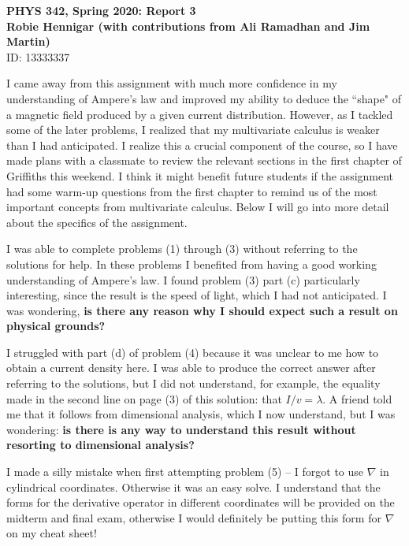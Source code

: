 \documentclass[11pt,usenames,dvipsnames]{article}
\begin{document}

\begin{center}
  \large\textbf{PHYS 342, Spring 2020: Report 3} \\ \vspace{10 pt}
  \textbf{Robie Hennigar (with contributions from Ali Ramadhan and Jim Martin)} \\
  \normalsize ID: 13333337 \\
\end{center}


I came away from this assignment with much more confidence in my understanding of Ampere's law and improved my ability to deduce the ``shape" of a magnetic field produced by a given current distribution.  However, as I tackled some of the later problems, I realized that my multivariate calculus is weaker than I had anticipated.  I realize this a crucial component of the course, so I have made plans with a classmate to review the relevant sections in the first chapter of Griffiths this weekend. I think it might benefit future students if the assignment had some warm-up questions from the first chapter to remind us of the most important concepts from multivariate calculus. Below I will go into more detail about the specifics of the assignment.

I was able to complete problems (1) through (3) without referring to the solutions for help. In these problems I benefited from having a good working understanding of Ampere's law. I found problem (3) part (c) particularly interesting, since the result is the speed of light, which I had not anticipated.  I was wondering, \textbf{ is there any reason why I should expect such a result on physical grounds?}

I struggled with part (d) of problem (4) because it was unclear to me how to obtain a current density here.  I was able to produce the correct answer after referring to the solutions, but I did not understand, for example, the equality made in the second line on page (3) of this solution: that $I/v = \lambda$.  A friend told me that it follows from dimensional analysis, which I now understand, but I was wondering: \textbf{ is there is any way to understand this result without resorting to dimensional analysis?}

I made a silly mistake when first attempting problem (5) -- I forgot to use $\nabla$ in cylindrical coordinates. Otherwise it was an easy solve. I understand that the forms for the derivative operator in different coordinates will be provided on the midterm and final exam, otherwise I would definitely be putting this form for $\nabla$ on my cheat sheet!
\end{document}
